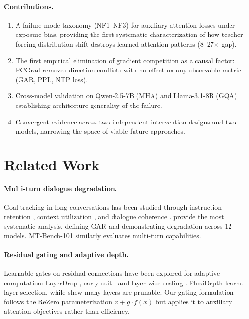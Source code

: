 \documentclass[11pt]{article}
\newcommand{\gar}{\textsc{GAR}}
\begin{document}
\paragraph{Contributions.}
\begin{enumerate}
    \item A failure mode taxonomy (NF1--NF3) for auxiliary attention losses under exposure bias, providing the first systematic characterization of how teacher-forcing distribution shift destroys learned attention patterns (8--27$\times$ gap).
    \item The first empirical elimination of gradient competition as a causal factor: PCGrad removes direction conflicts with no effect on any observable metric (GAR, PPL, NTP loss).
    \item Cross-model validation on Qwen-2.5-7B (MHA) and Llama-3.1-8B (GQA) establishing architecture-generality of the failure.
    \item Convergent evidence across two independent intervention designs and two models, narrowing the space of viable future approaches.
\end{enumerate}

\section{Related Work}

\paragraph{Multi-turn dialogue degradation.}
Goal-tracking in long conversations has been studied through instruction retention \citep{qin2024infobench,dongre2026goal}, context utilization \citep{liu2024lost,hsieh2024ruler}, and dialogue coherence \citep{ko2024multichallenge}. \citet{dongre2026goal} provide the most systematic analysis, defining \gar{} and demonstrating degradation across 12 models. MT-Bench-101 \citep{bai2024mtbench101} similarly evaluates multi-turn capabilities.

\paragraph{Residual gating and adaptive depth.}
Learnable gates on residual connections have been explored for adaptive computation: LayerDrop \citep{fan2020layerdrop}, early exit \citep{schuster2022confident}, and layer-wise scaling \citep{bachlechner2021rezero}. FlexiDepth \citep{luo2025flexidepth} learns layer selection, while \citet{gromov2024unreasonable} show many layers are prunable. Our gating formulation follows the ReZero parameterization $x + g \cdot f(x)$ but applies it to auxiliary attention objectives rather than efficiency.
\end{document}
